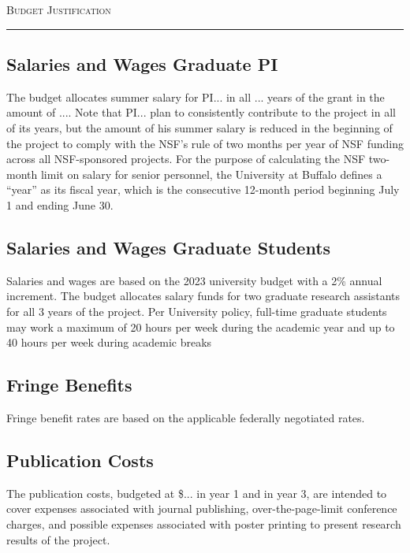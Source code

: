 



\begin{center}
{\LARGE \textsc{Budget Justification}}
\end{center}
\hrule
\vspace{3mm}


\subsection*{Salaries and Wages Graduate PI}
The budget allocates summer salary for PI... in all ... years of the grant in the amount of ....
Note that PI... plan to consistently contribute to the project in all of its years, but the amount of his summer salary is reduced in the beginning of the project to comply with the NSF's rule of two months per year of NSF funding across all NSF-sponsored projects.
For the purpose of calculating the NSF two-month limit on salary for senior personnel, the University at Buffalo defines a ``year'' as its fiscal year, which is the consecutive 12-month period beginning July 1 and ending June 30.


\subsection*{Salaries and Wages Graduate Students}
Salaries and wages are based on the 2023 university budget with a 2\% annual increment.
The budget allocates salary funds for two graduate research assistants for all 3 years of the project. 
Per University policy, full-time graduate students may work a maximum of 20 hours per week during the academic year and up to 40 hours per week during academic breaks

\subsection*{Fringe Benefits}

Fringe benefit rates are based on the applicable federally negotiated rates.

\subsection*{Publication Costs}
The publication costs, budgeted at \$... in year 1 and in year 3, are intended to cover expenses associated with journal publishing, over-the-page-limit conference charges, and possible expenses associated with poster printing to present research results of the project.

